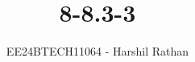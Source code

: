 \documentclass[journal]{IEEEtran}
\begin{document}

\vspace{3cm}

\title{8-8.3-3}
\author{EE24BTECH11064 - Harshil Rathan}
 \maketitle
{\let\newpage\relax\maketitle}

\renewcommand{\thefigure}{\theenumi}
\renewcommand{\thetable}{\theenumi}
\setlength{\intextsep}{10pt} %


\renewcommand{\thetable}{\theenumi}
\end{document}
